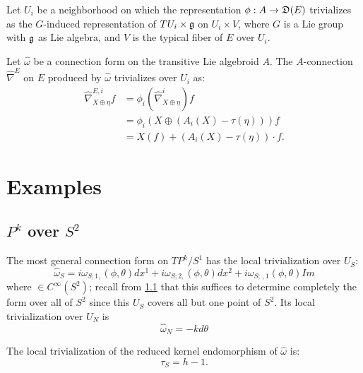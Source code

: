\begin{example}
Let $U_i$ be a neighborhood on which the representation $\phi:A \to \alg D(E)$ trivializes as the $G$-induced representation of $TU_i\times \mathfrak{g}$ on $U_i \times V$, where $G$ is a Lie group with $\mathfrak{g}$ as Lie algebra, and $V$ is the typical fiber of $E$ over $U_i$.

Let $\hat \omega$ be a connection form on the transitive Lie algebroid $A$. The $A$-connection $\hat \nabla^E$ on $E$ produced by $\hat \omega$ trivializes  over $U_i$ as:
\begin{align*}
    \hat \nabla^{E, i}_{X \oplus \eta} f
        &= \phi_i(\hat \nabla^i_{X \oplus \eta}) f\\
        &= \phi_i( X \oplus (A_i(X) - \tau(\eta))) f\\
        &= X(f) + (A_i(X) - \tau(\eta))\cdot f.
\end{align*}
\end{example}




\section{Examples}

\subsection{$P^k$ over $S^2$}

The most general connection form on $TP^k/S^1$ has the local trivialization over $U_S$:
\begin{equation}
    \hat \omega_S = i\omega_{S; 1,}(\phi, \theta) dx^1 + i\omega_{S; 2,}(\phi, \theta) dx^2 + i\omega_{S; \, ,1}(\phi, \theta) Im
\end{equation}
where $ \in C^\infty(S^2)$; recall from \ref{} that this suffices to determine completely the form over all of $S^2$ since this $U_S$ covers all but one point of $S^2$. Its local trivialization over $U_N$ is
\begin{equation}
     \hat \omega_N = - kd\theta
\end{equation}

The local trivialization of the reduced kernel endomorphism of $\hat \omega$ is:
\begin{equation}
    \tau_S = h - 1.
\end{equation}

